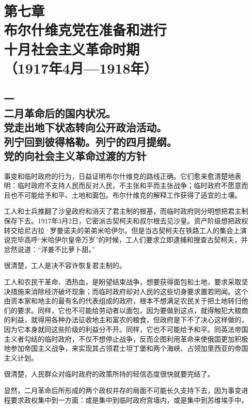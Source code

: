 \section[第七章\q 布尔什维克党在准备和进行十月社会主义革命时期（1917年4月—1918年）]{第七章\\ 布尔什维克党在准备和进行\\十月社会主义革命时期 \\{（1917年4月—1918年）}}

\subsection[一\q 二月革命后的国内状况。党走出地下状态转向公开政治活动。列宁回到彼得格勒。列宁的四月提纲。党的向社会主义革命过渡的方针]{一\\二月革命后的国内状况。\\党走出地下状态转向公开政治活动。\\列宁回到彼得格勒。列宁的四月提纲。\\党的向社会主义革命过渡的方针}

事变和临时政府的行为，日益证明布尔什维克的路线正确。它们愈来愈清楚地表明：临时政府不支持人民而反对人民，不主张和平而主张战争；临时政府不愿意而且也不可能给予和平、土地和面包。布尔什维克的解释工作获得了适宜的土壤。

工人和士兵推翻了沙皇政府和消灭了君主制的根基，而临时政府则分明想把君主制保存下去。1917年3月2日，它密派古契柯夫和叔尔根去见沙皇。资产阶级想把政权转交给尼古拉·罗曼诺夫的弟弟米哈伊尔。但是当古契柯夫在铁路工人的集会上演说完毕高呼“米哈伊尔皇帝万岁”的时候，工人们要求立即逮捕和搜查古契柯夫，并忿然说道：“洋姜不比萝卜甜。”

很清楚，工人是决不容许恢复君主制的。

工人和农民干革命、洒热血，是盼望结束战争，想要获得面包和土地，要求采取坚决措施来消除经济破坏现象；而临时政府却对人民的这些切身要求置若罔闻。这个由资本家和地主的最有名的代表组成的政府，根本不想满足农民关于把土地转归他们的要求。同样，它也不可能给劳动者以面包，因为要做到这点，就得触犯大粮商的利益，就得用各种办法征收地主和富农的粮食，但政府是下不了决心这样做的，因为它本身就同这些阶级的利益分不开。同样，它也不可能给予和平。同英法帝国主义者勾结的临时政府，不仅不想停止战争，反而企图利用革命来使俄国更加积极地参加帝国主义战争，来实现其占领君士坦丁堡和两个海峡、占领加里西亚的帝国主义计划。

很清楚，人民群众对临时政府的政策所持的轻信态度很快就要完结了。

显然，二月革命后所形成的两个政权并存的局面不可能长久支持下去，因为事变进程要求政权集中到一方面：或是集中到临时政府宫墙内，或是集中到苏维埃手中。

